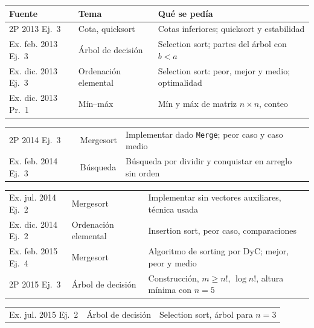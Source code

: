 {\medskip
\begin{tabularx}{\textwidth}{@{}>{\raggedright\arraybackslash}p{2.95cm}>{\raggedright\arraybackslash}p{2.75cm}>{\raggedright\arraybackslash}X@{}}
\toprule
Fuente & Tema & Qué se pedía \\
\midrule
2P 2013 Ej.~3 & Cota, quicksort & Cotas inferiores; quicksort y estabilidad \\
Ex. feb. 2013 Ej.~3 & Árbol de decisión & Selection sort; partes del árbol con $b<a$ \\
Ex. dic. 2013 Ej.~3 & Ordenación elemental & Selection sort: peor, mejor y medio; optimalidad \\
Ex. dic. 2013 Pr.~1 & Mín--máx & Mín y máx de matriz $n\times n$, conteo \\
\end{tabularx}\par\vspace{-\parskip}
\begin{tabularx}{\textwidth}{@{}>{\raggedright\arraybackslash}p{2.95cm}>{\raggedright\arraybackslash}p{2.75cm}>{\raggedright\arraybackslash}X@{}}
2P 2014 Ej.~3 & Mergesort & Implementar dado \texttt{Merge}; peor caso y caso medio \\
Ex. feb. 2014 Ej.~3 & Búsqueda & Búsqueda por dividir y conquistar en arreglo sin orden \\
\end{tabularx}\par\vspace{-\parskip}
\begin{tabularx}{\textwidth}{@{}>{\raggedright\arraybackslash}p{2.95cm}>{\raggedright\arraybackslash}p{2.75cm}>{\raggedright\arraybackslash}X@{}}
Ex. jul. 2014 Ej.~2 & Mergesort & Implementar sin vectores auxiliares, técnica usada \\
Ex. dic. 2014 Ej.~2 & Ordenación elemental & Insertion sort, peor caso, comparaciones \\
Ex. feb. 2015 Ej.~4 & Mergesort & Algoritmo de sorting por DyC; mejor, peor y medio \\
2P 2015 Ej.~3 & Árbol de decisión & Construcción, $m\ge n!$, $\log n!$, altura mínima con $n=5$ \\
\end{tabularx}\par\vspace{-\parskip}
\begin{tabularx}{\textwidth}{@{}>{\raggedright\arraybackslash}p{2.95cm}>{\raggedright\arraybackslash}p{2.75cm}>{\raggedright\arraybackslash}X@{}}
Ex. jul. 2015 Ej.~2 & Árbol de decisión & Selection sort, árbol para $n=3$ \\

\end{tabularx}}
